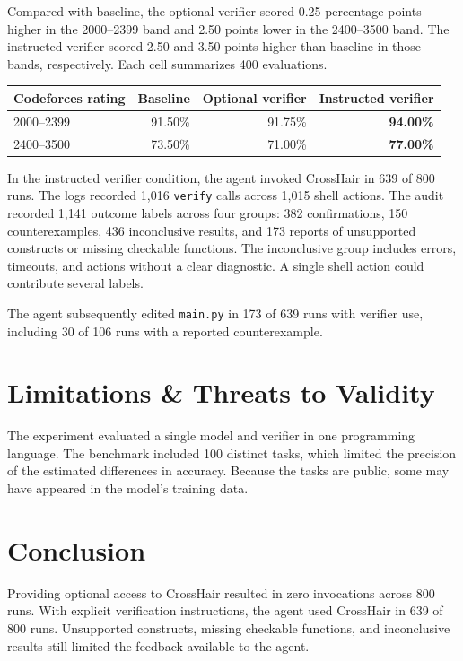 \documentclass[11pt,a4paper]{article}
\begin{document}
Compared with baseline, the optional verifier scored 0.25 percentage points higher in the 2000--2399 band and 2.50 points lower in the 2400--3500 band. The instructed verifier scored 2.50 and 3.50 points higher than baseline in those bands, respectively. Each cell summarizes 400 evaluations.

\begin{center}
\small
{}\label{tab:rating}
\begin{tabular}{@{}lrrr@{}}
\toprule
Codeforces rating & Baseline & Optional verifier & Instructed verifier \\
\midrule
2000--2399 & 91.50\% & 91.75\% & \textbf{94.00\%} \\
2400--3500 & 73.50\% & 71.00\% & \textbf{77.00\%} \\
\bottomrule
\end{tabular}
\end{center}

In the instructed verifier condition, the agent invoked CrossHair in 639 of 800 runs. The logs recorded 1,016 \texttt{verify} calls across 1,015 shell actions. The audit recorded 1,141 outcome labels across four groups: 382 confirmations, 150 counterexamples, 436 inconclusive results, and 173 reports of unsupported constructs or missing checkable functions. The inconclusive group includes errors, timeouts, and actions without a clear diagnostic. A single shell action could contribute several labels.

The agent subsequently edited \texttt{main.py} in 173 of 639 runs with verifier use, including 30 of 106 runs with a reported counterexample.

\section{Limitations \& Threats to Validity}
The experiment evaluated a single model and verifier in one programming language. The benchmark included 100 distinct tasks, which limited the precision of the estimated differences in accuracy. Because the tasks are public, some may have appeared in the model's training data.

\newpage

\section{Conclusion}
Providing optional access to CrossHair resulted in zero invocations across 800 runs. With explicit verification instructions, the agent used CrossHair in 639 of 800 runs. Unsupported constructs, missing checkable functions, and inconclusive results still limited the feedback available to the agent.
\end{document}
